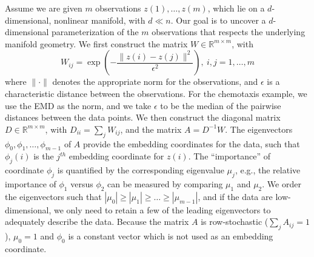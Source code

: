 \documentclass[prl, reprint]{revtex4-1}
\begin{document}
Assume we are given $m$ observations $z(1), \dots, z(m)$, which lie on a $d$-dimensional, nonlinear manifold, with $d \ll n$. 
%
Our goal is to uncover a $d$-dimensional parameterization of the $m$ observations that respects the underlying manifold geometry.
%
We first construct the matrix $W \in \mathbb{R}^{m \times m}$, with
\begin{equation} \label{eq:W}
W_{ij} = \exp \left( -\frac{\|z(i) - z(j) \|^2}{\epsilon^2} \right), \ i,j=1,\ldots,m
\end{equation}
where $\| \cdot \|$ denotes the appropriate norm for the observations, and $\epsilon$ is a characteristic distance between the observations. 
%
For the chemotaxis example, we use the EMD as the norm, and we take $\epsilon$ to be the median of the pairwise distances between the data points.
%
We then construct the diagonal matrix $D \in \mathbb{R}^{m \times m}$, with $D_{ii} = \sum_j W_{ij}$, and the matrix $A  = D^{-1} W.$
%
The eigenvectors $\phi_0, \phi_1, \dots, \phi_{m-1}$ of $A$ provide the embedding coordinates for the data, such that
$\phi_{j}(i)$ is the $j^{th}$ embedding coordinate for $z(i)$.
%
The ``importance'' of coordinate $\phi_j$ is quantified by the corresponding eigenvalue $\mu_j$, e.g., the relative importance of $\phi_1$ versus $\phi_2$ can be measured by comparing $\mu_1$ and $\mu_2$.
%
We order the eigenvectors such that $|\mu_0| \ge |\mu_1| \ge \dots \ge |\mu_{m-1}|$, and if the data are low-dimensional, we only need to retain a few of the leading eigenvectors to adequately describe the data.
%
Because the matrix $A$ is row-stochastic ($\sum_j A_{ij} = 1$),  $\mu_0 = 1$ and $\phi_0$ is a constant vector which is not used as an embedding coordinate.
\end{document}
